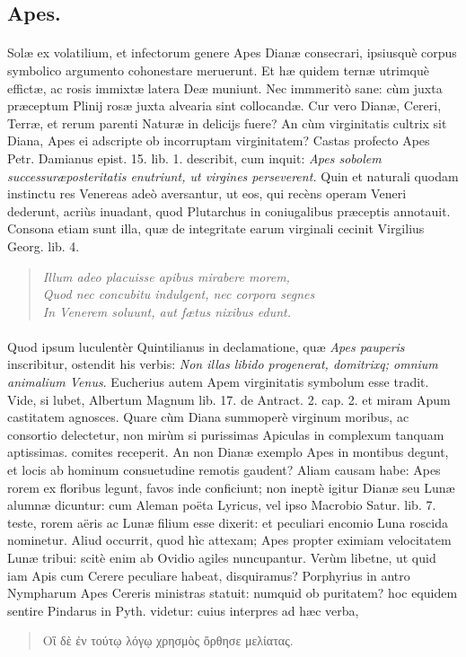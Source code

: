 \documentclass[a4paper, 11pt, oneside, polutonikogreek, latin]{article}
\begin{document}
\subsection{Apes.}
\paragraph{}
Solæ ex volatilium, et infectorum genere Apes Dianæ consecrari, ipsiusquè corpus symbolico argumento cohonestare meruerunt. Et hæ quidem ternæ utrimquè effictæ, ac rosis immixtæ latera Deæ muniunt. Nec immmeritò sane: cùm juxta præceptum Plinij rosæ juxta alvearia sint collocandæ. Cur vero Dianæ, Cereri, Terræ, et rerum parenti Naturæ in delicijs fuere? An cùm virginitatis cultrix sit Diana, Apes ei adscripte ob incorruptam virginitatem? Castas profecto Apes Petr. Damianus epist. 15. lib. 1. describit, cum inquit: \emph{Apes sobolem successuræposteritatis enutriunt, ut virgines perseverent.} Quin et naturali quodam instinctu res Venereas adeò aversantur, ut eos, qui recèns operam Veneri dederunt, acriùs inuadant, quod Plutarchus in coniugalibus præceptis annotauit. Consona etiam sunt illa, quæ de integritate earum virginali cecinit Virgilius Georg. lib. 4.
\begin{quote}
\emph{Illum adeo placuisse apibus mirabere morem,}\\
\emph{Quod nec concubitu indulgent, nec corpora segnes}\\
\emph{In Venerem soluunt, aut fætus nixibus edunt.}\\
\end{quote}
\vspace*{-8mm}
\paragraph{}
Quod ipsum luculentèr Quintilianus in declamatione, quæ \emph{Apes pauperis} inscribitur, ostendit his verbis: \emph{Non illas libido progenerat, domitrixq; omnium animalium Venus}. Eucherius autem Apem virginitatis symbolum esse tradit. Vide, si lubet, Albertum Magnum lib. 17. de Antract. 2. cap. 2. et miram Apum castitatem agnosces. Quare cùm Diana summoperè virginum moribus, ac consortio delectetur, non mirùm si purissimas Apiculas in complexum tanquam aptissimas. comites receperit. An non Dianæ exemplo Apes in montibus degunt, et locis ab hominum consuetudine remotis gaudent? Aliam causam habe: Apes rorem ex floribus legunt, favos inde conficiunt; non ineptè igitur Dianæ seu Lunæ alumnæ dicuntur: cum Aleman poëta Lyricus, vel ipso Macrobio Satur. lib. 7. teste, rorem aëris ac Lunæ filium esse dixerit: et peculiari encomio Luna roscida nominetur. Aliud occurrit, quod hìc attexam; Apes propter eximiam velocitatem Lunæ tribui: scitè enim ab Ovidio agiles nuncupantur. Verùm libetne, ut quid iam Apis cum Cerere peculiare habeat, disquiramus? Porphyrius in antro Nympharum Apes Cereris ministras statuit: numquid ob puritatem? hoc equidem sentire Pindarus in Pyth. videtur: cuius interpres ad hæc verba,
\begin{quote}
Οἳ δὲ ἐν τούτῳ λόγῳ χρησμὸς ὄρθησε μελίατας.
\end{quote}
\vspace*{-4mm}
\end{document}
